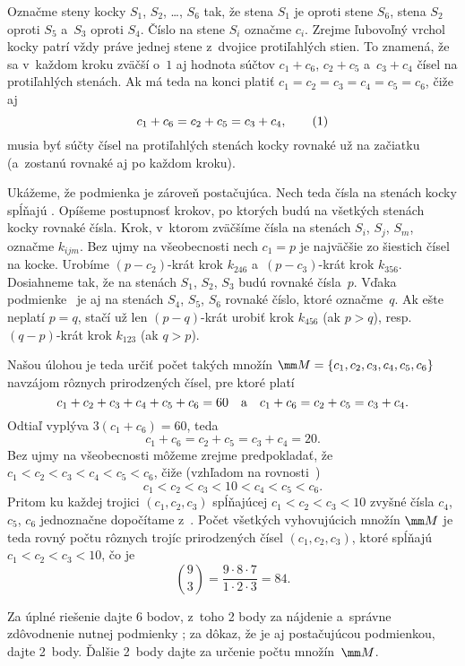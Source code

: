 {%
Označme steny kocky $S_1$, $S_2$, \dots, $S_6$ tak, že stena $S_1$ je
oproti stene $S_6$, stena $S_2$ oproti $S_5$ a~$S_3$ oproti $S_4$.
Číslo na stene $S_i$ označme $c_i$.
Zrejme ľubovoľný vrchol kocky
patrí vždy práve jednej stene z~dvojice protiľahlých stien. %
To znamená, že sa v~každom kroku zväčší o~$1$ aj hodnota súčtov
$c_1+c_6$, $c_2+c_5$ a~$c_3+c_4$ čísel na protiľahlých stenách.
Ak má teda na konci platiť $c_1=c_2=c_3=c_4=c_5=c_6$, čiže aj
$$
c_1+c_6=c_2+c_5=c_3+c_4,         \tag1
$$
musia byť súčty čísel na protiľahlých stenách kocky rovnaké už na
začiatku (a~zostanú rovnaké aj po každom kroku).

Ukážeme, že podmienka  je zároveň postačujúca. Nech teda čísla na
stenách kocky spĺňajú .
Opíšeme postupnosť krokov, po ktorých budú na všetkých stenách kocky rovnaké
čísla. Krok, v~ktorom zväčšíme čísla na stenách $S_i$, $S_j$, $S_m$,
označme $k_{ijm}$. Bez ujmy na všeobecnosti nech $c_1=p$ je najväčšie zo šiestich
čísel na kocke. Urobíme $(p-c_2)$-krát krok $k_{246}$
a~$(p-c_3)$-krát krok $k_{356}$. Dosiahneme tak, že na stenách $S_1$,
$S_2$, $S_3$ budú rovnaké čísla~$p$. Vďaka
podmienke~ je aj na stenách $S_4$, $S_5$, $S_6$
rovnaké číslo, ktoré označme~$q$. Ak ešte neplatí $p=q$, stačí už len
$(p-q)$-krát urobiť krok $k_{456}$ (ak $p>q$), resp. $(q-p)$-krát krok
$k_{123}$ (ak $q>p$).

Našou úlohou je teda určiť počet takých množín
$\mm M=\{c_1,c_2,c_3,c_4,c_5,c_6\}$ navzájom rôznych prirodzených čísel, pre ktoré
platí
$$
c_1+c_2+c_3+c_4+c_5+c_6=60\quad \hbox{a} \quad c_1+c_6=c_2+c_5=c_3+c_4.
$$
Odtiaľ vyplýva $3(c_1+c_6)=60$, teda
$$
c_1+c_6=c_2+c_5=c_3+c_4=20. \tag{2}
$$
Bez ujmy na všeobecnosti môžeme zrejme predpokladať, že $c_1<c_2<c_3<c_4<c_5<c_6$,
čiže (vzhľadom na rovnosti~)
$$
c_1<c_2<c_3<10<c_4<c_5<c_6.
$$
Pritom ku každej trojici $(c_1,c_2,c_3)$ spĺňajúcej $c_1<c_2<c_3<10$ zvyšné
čísla $c_4$, $c_5$, $c_6$ jednoznačne dopočítame z~.
Počet všetkých vyhovujúcich množín $\mm M$ je teda rovný počtu
rôznych trojíc prirodzených čísel $(c_1,c_2,c_3)$, ktoré
spĺňajú $c_1<c_2<c_3<10$, čo je
$$
{9 \choose 3}=\frac{9\cdot8\cdot7}{1\cdot2\cdot3}=84.
$$

\nobreak\medskip\petit\noindent
Za úplné riešenie dajte 6 bodov, z~toho 2 body za nájdenie a~správne
zdôvodnenie nutnej podmienky ; za dôkaz, že  je aj postačujúcou podmienkou,
dajte 2~body. Ďalšie 2~body dajte za určenie počtu množín~$\mm M$.
\endpetit
\bigbreak
}

